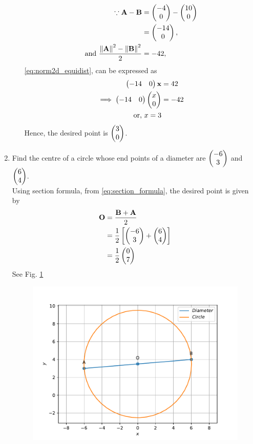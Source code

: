 \documentclass[journal,12pt,twocolumn]{IEEEtran}
\renewcommand\thesection{\arabic{section}}
\begin{document}
\begin{enumerate}[label=\thesection.\arabic*.,ref=\thesection.\theenumi]
\begin{enumerate}
		\begin{align}
	\because  \mathbf{A}-\mathbf{B} &= \begin{pmatrix} -4 \\ 0\end{pmatrix}-\begin{pmatrix}10 \\ 0\end{pmatrix}
	  \\
	  &= \begin{pmatrix} -14 \\ 0\end{pmatrix},
	  \\
			\text{and }	   \frac{\left\lVert\mathbf{A}\right\rVert^2 - \left\lVert\mathbf{B}\right\rVert^2}{2} &= -42,
  \end{align}
  \eqref{eq:norm2d_equidist}, can be expressed as 
  \begin{align}
	  \begin{pmatrix} -14 & 0\end{pmatrix}\mathbf{x} 
	  &=  42
	  \\
	  \implies 
	  \begin{pmatrix} -14 & 0\end{pmatrix}\begin{pmatrix}x \\ 0\end{pmatrix} 
	  &=  -42
	  \\
	  \text{or, } x =3 
  \end{align}
  Hence, the desired point is $\begin{pmatrix} 3 \\ 0\end{pmatrix}$.
  \end{enumerate}
  \item Find the centre of a circle whose end points of a diameter are $\begin{pmatrix} -6 \\ 3\end{pmatrix}$ and $\begin{pmatrix}6 \\ 4\end{pmatrix}$.
	  \\
		\solution 
Using section formula, 
	  from \eqref{eq:section_formula},
		the desired point is given by 
  \begin{align}
	  \mathbf{O}&= \frac{\mathbf{B}+ \mathbf{A}}{2}
	  \\
	  &= \frac{1}{2}{}\left[\begin{pmatrix} -6 \\ 3\end{pmatrix}+\begin{pmatrix}6 \\ 4\end{pmatrix}\right]
	  \\
	  &=\frac{1}{2}\begin{pmatrix}0 \\ 7\end{pmatrix}
  \end{align}
    See Fig. 
	  \ref{fig:cbse-10-3.pdf}
  \begin{figure}
	  \centering 
	  \includegraphics[width=\columnwidth]{figs/cbse-10-3.pdf}
	  \caption{}
	  \label{fig:cbse-10-3.pdf}
	  \end{figure}


\end{enumerate}
\end{document}
